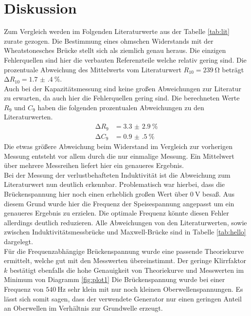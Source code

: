 \section{Diskussion}
Zum Vergleich werden im Folgenden Literaturwerte aus der Tabelle \ref{tab:lit} zurate gezogen.
Die Bestimmung eines ohmschen Widerstands mit der Wheatstonesches Brücke stellt sich als ziemlich genau heraus. Die einzigen Fehlerquellen sind
hier die verbauten Referenzteile welche relativ gering sind. Die prozentuale Abweichung des Mittelwerts vom Literaturwert $R_{10} =\SI{239}{\ohm}$ beträgt 
$\increment R_{10} = \SI{1.7(4)}{\percent}$.
\\
\newline
Auch bei der Kapazitätsmessung sind keine großen Abweichungen zur Literatur zu erwarten, da auch hier die Fehlerquellen gering sind. Die berechneten Werte $R_{9}$ und $C_{9}$
haben die folgenden prozentualen Abweichungen zu den Literaturwerten. 
\begin{align*}
\increment R_{9} &= \SI{3.3(29)}{\percent} \\
\increment C_{9} &= \SI{0.9(5)}{\percent}
\end{align*}
Die etwas größere Abweichung beim Widerstand im Vergleich zur vorherigen Messung entsteht vor allem durch die nur einmalige Messung. Ein Mittelwert über mehrere Messreihen liefert hier ein genaueres Ergebnis.
\\
\newline
Bei der Messung der verlustbehafteten Induktivität ist die Abweichung zum Literaturwert nun deutlich erkennbar. Problematisch war hierbei, dass die Brückenspannung hier noch einen erheblich
großen Wert über $\SI{0}{\volt}$ besaß. Aus diesem Grund wurde hier die Frequenz der Speisespannung angepasst um ein genaueres Ergebnis zu erzielen. Die optimale Frequenz könnte diesen Fehler
allerdings deutlich reduzieren. Alle Abweichungen von den Literaturwerten, sowie zwischen Induktivitätsmessbrücke und Maxwell-Brücke sind in Tabelle \ref{tab:hello} dargelegt.
\\
\newline
Für die Frequenzabhängige Brückenspannung wurde eine passende Theoriekurve ermittelt, welche gut mit den Messwerten übereinstimmt. Der geringe Klirrfaktor $k$ bestätigt ebenfalls
die hohe Genauigkeit von Theoriekurve und Messwerten im Minimum von Diagramm \ref{fig:plot1} Die Brückenspannung wurde bei einer Frequenz von $\SI{540}{\hertz}$ sehr klein mit nur noch kleinen Oberwellenspannungen. Es lässt 
sich somit sagen, dass der verwendete Generator nur einen geringen Anteil an Oberwellen im Verhältnis zur Grundwelle erzeugt.